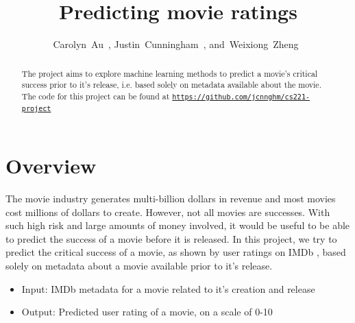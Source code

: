 \documentclass[journal]{IEEEtran}
\begin{document}
\title{Predicting movie ratings}

\author{Carolyn~Au~,
        Justin~Cunningham~,
        and~Weixiong~Zheng~}

%
{}

\maketitle


\begin{abstract}
The project aims to explore machine learning methods to predict a movie's critical success prior
to it's release, i.e. based solely on metadata available about the movie. The code for this project
can be found at \texttt{\url{https://github.com/jcnnghm/cs221-project}}
\end{abstract}


\section{Overview}
The movie industry generates multi-billion dollars in revenue and most movies
cost millions of dollars to create.  However, not all movies are successes.
With such high risk and large amounts of money involved, it would be useful to
be able to predict the success of a movie before it is released. In this
project, we try to predict the critical success of a movie, as shown by user
ratings on IMDb \cite{imdb}, based solely on metadata about a movie available prior to it's
release.

\begin{itemize}
    \item Input: IMDb metadata for a movie related to it's creation and release
    \item Output: Predicted user rating of a movie, on a scale of 0-10
\end{itemize}
\end{document}
